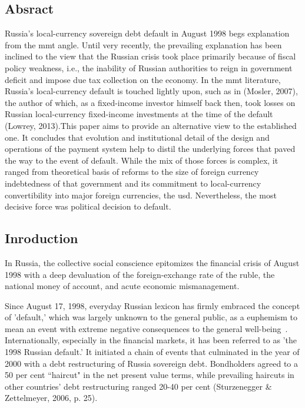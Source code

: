 \subsection*{Absract}

Russia's local-currency sovereign debt default in August 1998 begs explanation from the \acf{mmt} angle. Until very recently, the prevailing explanation has been inclined to the view that the Russian crisis took place primarily because of fiscal policy weakness, i.e., the inability of Russian authorities to reign in government deficit and impose due tax collection on the economy. In the \ac{mmt} literature, Russia's local-currency default is touched lightly upon, such as in (Mosler, 2007), the author of which, as a fixed-income investor himself back then, took losses on Russian local-currency fixed-income investments at the time of the default (Lowrey, 2013).This paper aims to provide an alternative view to the established one. It concludes that evolution and institutional detail of the design and operations of the payment system help to distil the underlying forces that paved the way to the event of default. While the mix of those forces is complex, it ranged from theoretical basis of reforms to the size of foreign currency indebtedness of that government and its commitment to local-currency convertibility into major foreign currencies, the \acf{usd}. Nevertheless, the most decisive force was political decision to default. 

\subsection{Inroduction}

In Russia, the collective social conscience epitomizes the financial crisis of August 1998 with a deep devaluation of the foreign-exchange rate of the ruble, the national money of account, and acute economic mismanagement. 

Since August 17, 1998, everyday Russian lexicon has firmly embraced the concept of 'default,' which was largely unknown to the general public, as a euphemism to mean an event with extreme negative consequences to the general well-being~\citep[p.~19]{bashkirova2012}. 
Internationally, especially in the financial markets, it has been referred to as 'the 1998 Russian default.' It initiated a chain of events that culminated in the year of 2000 with a debt restructuring of Russia sovereign debt. Bondholders agreed to a 50 per cent ``haircut" in the net present value terms, while prevailing haircuts in other countries' debt restructuring ranged 20-40 per cent (Sturzenegger \& Zettelmeyer, 2006, p. 25).

